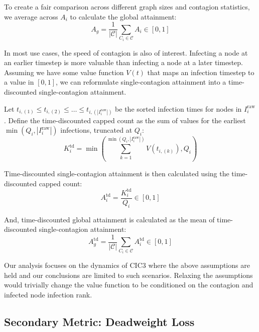 \documentclass[sigconf]{acmart}
\begin{document}
To create a fair comparison across different graph sizes and contagion statistics, we average across $A_i$ to calculate the global attainment:
\begin{equation}
    A_g = \frac{1}{|\mathcal{C}|} \sum_{C_i \in \mathcal{C}} A_i \in [0, 1]
\label{eq:global_attainment}
\end{equation}

In most use cases, the speed of contagion is also of interest. Infecting a node at an earlier timestep is more valuable than infecting a node at a later timestep. Assuming we have some value function $V(t)$ that maps an infection timestep to a value in $[0,1]$, we can reformulate single-contagion attainment into a time-discounted single-contagion attainment.

Let $t_{i,(1)} \le t_{i,(2)} \le \dots \le t_{i,(|I_i^{\text{raw}}|)}$ be the sorted infection times for nodes in $I_i^{\text{raw}}$. Define the time-discounted capped count as the sum of values for the earliest $\min(Q_i, |I_i^{\text{raw}}|)$ infections, truncated at $Q_i$:
\begin{equation}
    K_i^{\text{td}} = \min\left(\sum_{k=1}^{\min(Q_i, |I_i^{\text{raw}}|)} V(t_{i,(k)}), Q_i\right)
\label{eq:td_capped_count}
\end{equation}

Time-discounted single-contagion attainment is then calculated using the time-discounted capped count:
\begin{equation}
    A_i^{\text{td}} = \frac{K_i^{\text{td}}}{Q_i} \in [0, 1]
\label{eq:td_attainment}
\end{equation}

And, time-discounted global attainment is calculated as the mean of time-discounted single-contagion attainment:
\begin{equation}
    A_g^{\text{td}} = \frac{1}{|\mathcal{C}|} \sum_{C_i \in \mathcal{C}} A_i^{\text{td}} \in [0, 1]
\label{eq:td_global_attainment}
\end{equation}

Our analysis focuses on the dynamics of CIC3 where the above assumptions are held and our conclusions are limited to such scenarios. Relaxing the assumptions would trivially change the value function to be conditioned on the contagion and infected node infection rank.

\subsection{Secondary Metric: Deadweight Loss}
\label{subsec:deadweight}
\end{document}
